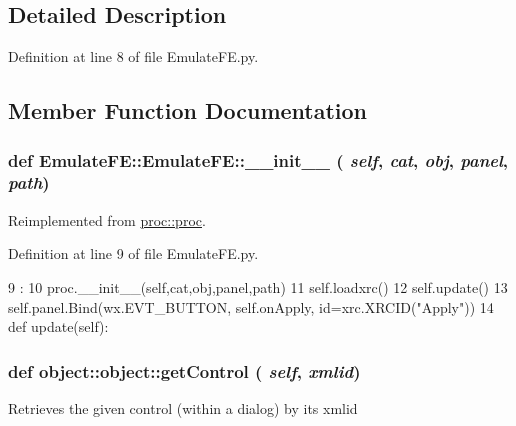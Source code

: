 \subsection{Detailed Description}


Definition at line 8 of file EmulateFE.py.

\subsection{Member Function Documentation}
\hypertarget{classEmulateFE_1_1EmulateFE_a3749dd5f45e93a8550800372a3ee40b6}{
\subsubsection[{\_\-\_\-init\_\-\_\-}]{\setlength{\rightskip}{0pt plus 5cm}def EmulateFE::EmulateFE::\_\-\_\-init\_\-\_\- ( {\em self}, \/   {\em cat}, \/   {\em obj}, \/   {\em panel}, \/   {\em path})}}
\label{classEmulateFE_1_1EmulateFE_a3749dd5f45e93a8550800372a3ee40b6}


Reimplemented from \hyperlink{classproc_1_1proc_a21e9bcad44f0098f74639f245d2d0e4b}{proc::proc}.

Definition at line 9 of file EmulateFE.py.


\begin{DoxyCode}
9                                              :
10         proc.__init__(self,cat,obj,panel,path)
11         self.loadxrc()
12         self.update()
13         self.panel.Bind(wx.EVT_BUTTON, self.onApply, id=xrc.XRCID("Apply"))
14 
    def update(self):
\end{DoxyCode}
\hypertarget{classobject_1_1object_ac765747a2b581d48eeb94e600c31fc3f}{
\subsubsection[{getControl}]{\setlength{\rightskip}{0pt plus 5cm}def object::object::getControl ( {\em self}, \/   {\em xmlid})}}
\label{classobject_1_1object_ac765747a2b581d48eeb94e600c31fc3f}
\begin{DoxyVerb}Retrieves the given control (within a dialog) by its xmlid\end{DoxyVerb}
 

